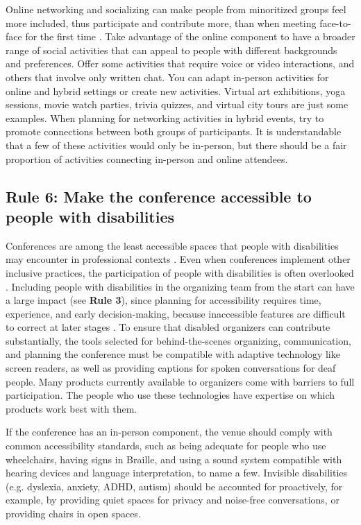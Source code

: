 \documentclass[10pt,letterpaper]{article}
\begin{document}
Online networking and socializing can make people from minoritized groups feel more included, thus participate and contribute more, than when meeting face-to-face for the first time \cite{trianaDoesOrderFacetoFace2012,blackEngenderingBelongingThoughtful2020}.
Take advantage of the online component to have a broader range of social activities that can appeal to people with different backgrounds and preferences.
Offer some activities that require voice or video interactions, and others that involve only written chat.
You can adapt in-person activities for online and hybrid settings or create new activities. 
Virtual art exhibitions, yoga sessions, movie watch parties, trivia quizzes, and virtual city tours are just some examples.
When planning for networking activities in hybrid events, try to
promote connections between both groups of participants.
It is understandable that a few of these activities would only be in-person, but 
there should be a fair proportion of activities connecting in-person and online attendees. 


\subsection*{Rule 6: Make the conference accessible to people with disabilities}
\label{rule_accessibility}

Conferences are among the least accessible spaces that people with disabilities may encounter in professional contexts \cite{priceAccessImaginedConstruction2009}. Even when conferences implement other inclusive practices, the participation of people with disabilities is often overlooked \cite{marks2021meeting}. Including people with disabilities in the organizing team from the start can have a large impact (see \textbf{Rule 3}), since planning for accessibility requires time, experience, and early decision-making, because inaccessible features are difficult to correct at later stages \cite{irishIncreasingParticipationUsing2020}. To ensure that disabled organizers can contribute substantially, the tools selected for behind-the-scenes organizing, communication, and planning the conference must be compatible with adaptive technology like screen readers, as well as providing captions for spoken conversations for deaf people. Many products currently available to organizers come with barriers to full participation. The people who use these technologies have expertise on which products work best with them.

If the conference has an in-person component, the venue should comply with common accessibility standards, such as being adequate for people who use wheelchairs, having signs in Braille, and using a sound system compatible with hearing devices and language interpretation, to name a few. 
Invisible disabilities  (e.g. dyslexia, anxiety, ADHD, autism) should be accounted for proactively, for example, by providing quiet spaces for privacy and noise-free conversations, or providing chairs in open spaces.
\end{document}
